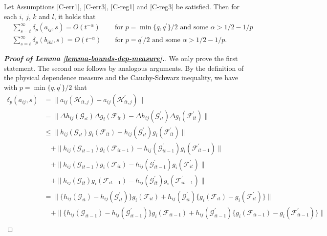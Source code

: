 \begin{lemmaA}\label{lemma-bounds-dep-measure}
Let Assumptions \ref{C-err1}, \ref{C-err3}, \ref{C-reg1} and \ref{C-reg3} be satisfied. Then for each $i$, $j$, $k$ and $l$, it holds that
\begin{align*}
 & \sum_{s=t}^\infty \delta_p(a_{ij}, s) = O(t^{-\alpha}) \, \qquad \text{for } p = \min\{q,q^\prime\}/2 \text{ and some } \alpha > 1/2 - 1/p \\
 & \sum_{s=t}^\infty \delta_p(b_{ikl}, s) = O(t^{-\alpha}) \qquad \text{for } p = q^\prime/2 \text{ and some } \alpha > 1/2 - 1/p.
\end{align*}
\end{lemmaA}


\begin{proof}[\textnormal{\textbf{Proof of Lemma \ref{lemma-bounds-dep-measure}.}}]
We only prove the first statement. The second one follows by analogous arguments. By the definition of the physical dependence measure and the Cauchy-Schwarz inequality, we have with $p = \min\{q,q^\prime\}/2$ that
\begin{align*}
\delta_p(a_{ij}, s) 
 & = \| a_{ij}(\mathcal{H}_{it,j}) - a_{ij}(\mathcal{H}_{it,j}^\prime) \| \\
 &= \| \Delta h_{ij}(\mathcal{G}_{it}) \Delta g_i(\mathcal{F}_{it}) -  \Delta h_{ij}(\mathcal{G}_{it}^\prime) \Delta g_i(\mathcal{F}_{it}^\prime) \| \\
 &\leq \| h_{ij}(\mathcal{G}_{it}) g_i(\mathcal{F}_{it}) - h_{ij}(\mathcal{G}_{it}^\prime) g_i(\mathcal{F}_{it}^\prime) \| \\
 &\quad + \| h_{ij}(\mathcal{G}_{it-1}) g_i(\mathcal{F}_{it-1}) - h_{ij}(\mathcal{G}_{it-1}^\prime) g_i(\mathcal{F}_{it-1}^\prime) \| \\
 &\quad + \| h_{ij}(\mathcal{G}_{it-1}) g_i(\mathcal{F}_{it}) - h_{ij}(\mathcal{G}_{it-1}^\prime) g_i(\mathcal{F}_{it}^\prime) \| \\
 &\quad + \| h_{ij}(\mathcal{G}_{it}) g_i(\mathcal{F}_{it-1}) - h_{ij}(\mathcal{G}_{it}^\prime) g_i(\mathcal{F}_{it-1}^\prime) \| \\
 & = \| \{ h_{ij}(\mathcal{G}_{it}) - h_{ij}(\mathcal{G}_{it}^\prime)\} g_i(\mathcal{F}_{it}) + h_{ij}(\mathcal{G}_{it}^\prime) \{g_i(\mathcal{F}_{it}) - g_i(\mathcal{F}_{it}^\prime)\} \| \\
 & \quad + \| \{ h_{ij}(\mathcal{G}_{it-1}) - h_{ij}(\mathcal{G}_{it-1}^\prime)\} g_i(\mathcal{F}_{it-1}) + h_{ij}(\mathcal{G}_{it-1}^\prime) \{g_i(\mathcal{F}_{it-1}) - g_i(\mathcal{F}_{it-1}^\prime)\} \| \\

\end{align*}
\end{proof}
